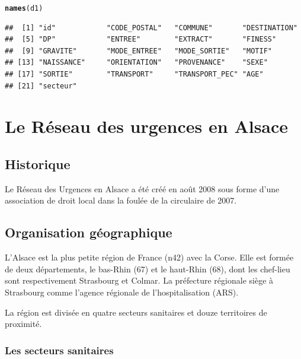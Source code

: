 \documentclass[12pt,english,french,twoside]{report}\usepackage[]{graphicx}\usepackage[]{color}
\makeatletter
\newcommand{\hlstd}[1]{\textcolor[rgb]{0.345,0.345,0.345}{#1}}%
\newcommand{\hlkwd}[1]{\textcolor[rgb]{0.737,0.353,0.396}{\textbf{#1}}}%
\newenvironment{kframe}{%
 \def\at@end@of@kframe{}%
 \ifinner\ifhmode%
  \def\at@end@of@kframe{\end{minipage}}%
  \begin{minipage}{\columnwidth}%
 \fi\fi%
 \def\FrameCommand##1{\hskip\@totalleftmargin \hskip-\fboxsep
 \colorbox{shadecolor}{##1}\hskip-\fboxsep
     \hskip-\linewidth \hskip-\@totalleftmargin \hskip\columnwidth}%
 \MakeFramed {\advance\hsize-\width
   \@totalleftmargin\z@ \linewidth\hsize
   \@setminipage}}%
 {\par\unskip\endMakeFramed%
 \at@end@of@kframe}
\newenvironment{knitrout}{}{} %
\makeatother
\begin{document}
\begin{knitrout}
\begin{kframe}
\begin{alltt}
\hlkwd{names}\hlstd{(d1)}
\end{alltt}
\begin{verbatim}
##  [1] "id"            "CODE_POSTAL"   "COMMUNE"       "DESTINATION"  
##  [5] "DP"            "ENTREE"        "EXTRACT"       "FINESS"       
##  [9] "GRAVITE"       "MODE_ENTREE"   "MODE_SORTIE"   "MOTIF"        
## [13] "NAISSANCE"     "ORIENTATION"   "PROVENANCE"    "SEXE"         
## [17] "SORTIE"        "TRANSPORT"     "TRANSPORT_PEC" "AGE"          
## [21] "secteur"
\end{verbatim}
\end{kframe}
\end{knitrout}


\part{Le Réseau des urgences en Alsace}
\newpage

\chapter{Historique}


Le Réseau des Urgences en Alsace a été créé en août 2008 sous forme d'une association de droit local dans la foulée de la circulaire de 2007.



\newpage
\chapter{Organisation géographique}


L'Alsace est la plus petite région de France (n42) avec la Corse. Elle est formée de deux départements, le bas-Rhin (67) et le haut-Rhin (68), dont les chef-lieu sont respectivement Strasbourg et Colmar. La préfecture régionale siège à Strasbourg comme l'agence régionale de l'hospitalisation  (ARS).

La région est divisée en quatre secteurs sanitaires et douze territoires de proximité.

\section{Les secteurs sanitaires}
\end{document}
